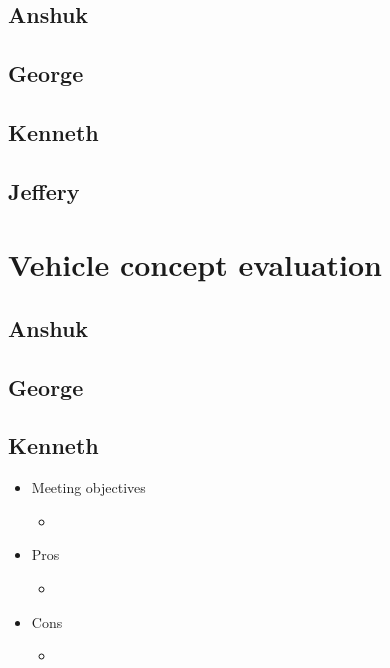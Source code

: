     \subsection{Anshuk}
    \subsection{George}
    \subsection{Kenneth}
    \subsection{Jeffery}

\section{Vehicle concept evaluation}

    \subsection{Anshuk}
    \subsection{George}
    \subsection{Kenneth}
        
        \begin{itemize}
            \item Meeting objectives
            \begin{itemize}
                \item 
            \end{itemize}
            \item Pros
            \begin{itemize}
                \item 
            \end{itemize}
            \item Cons
            \begin{itemize}
                \item 
            \end{itemize}
        \end{itemize}
        
